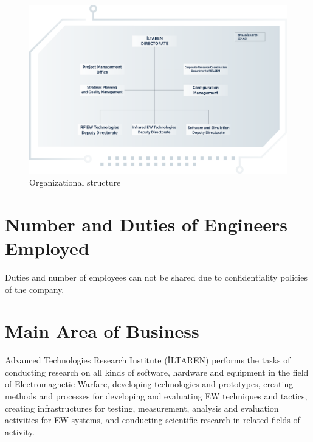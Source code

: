 \documentclass[12pt]{report}
\begin{document}
    \begin{figure}[h]
        \includegraphics[scale=0.18]{iltaren-organization}
        \centering
        \caption{Organizational structure}
    \end{figure}

    \section{Number and Duties of Engineers Employed}
    Duties and number of employees can not be shared due to confidentiality policies of the company.
    
    \section{Main Area of Business}

    Advanced Technologies Research Institute (İLTAREN) performs the tasks of conducting research on all kinds of software, hardware and 
    equipment in the field of Electromagnetic Warfare, developing technologies and prototypes, creating methods and processes for developing 
    and evaluating EW techniques and tactics, creating infrastructures for testing, measurement, analysis and evaluation activities for 
    EW systems, and conducting scientific research in related fields of activity.
\end{document}

